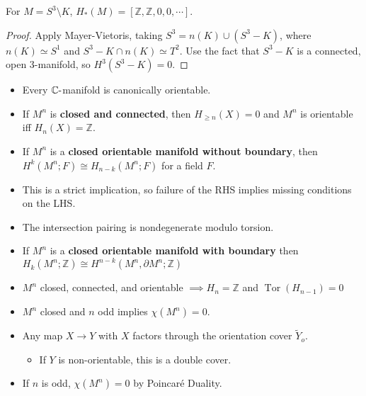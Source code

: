 \begin{proposition}

For \(M = S^3 \setminus K\),
\(H_*(M) = [{\mathbb{Z}}, {\mathbb{Z}}, 0, 0, \cdots]\).

\end{proposition}

\begin{proof}

Apply Mayer-Vietoris, taking \(S^3 = n(K) \cup (S^3-K)\), where
\(n(K) \simeq S^1\) and \(S^3-K \cap n(K) \simeq T^2\). Use the fact
that \(S^3-K\) is a connected, open 3-manifold, so \(H^3(S^3-K) =0\).

\end{proof}

\begin{itemize}
\tightlist
\item
  Every \({\mathbb{C}}{\hbox{-}}\)manifold is canonically orientable.
\item
  If \(M^n\) is \textbf{closed and connected}, then
  \(H_{\geq n}(X) = 0\) and \(M^n\) is orientable iff
  \(H_n(X) = {\mathbb{Z}}\).
\item
  If \(M^n\) is a \textbf{closed orientable manifold without boundary},
  then \(H^k(M^n; F) \cong H_{n-k}(M^n; F)\) for a field \(F\).
\item
  This is a strict implication, so failure of the RHS implies missing
  conditions on the LHS.
\item
  The intersection pairing is nondegenerate modulo torsion.
\item
  If \(M^n\) is a \textbf{closed orientable manifold with boundary} then
  \(H_k(M^n; {\mathbb{Z}}) \cong H^{n-k}(M^n, {\partial}M^n; {\mathbb{Z}})\)
\item
  \(M^n\) closed, connected, and orientable
  \(\implies H_n = {\mathbb{Z}}\) and
  \(\operatorname{Tor}(H_{n-1}) = 0\)
\item
  \(M^n\) closed and \(n\) odd implies \(\chi(M^n) = 0\).
\item
  Any map \(X \to Y\) with \(X\) factors through the orientation cover
  \(\tilde Y_o\).

  \begin{itemize}
  \tightlist
  \item
    If \(Y\) is non-orientable, this is a double cover.
  \end{itemize}
\item
  If \(n\) is odd, \(\chi(M^n) = 0\) by Poincaré Duality.
\end{itemize}

